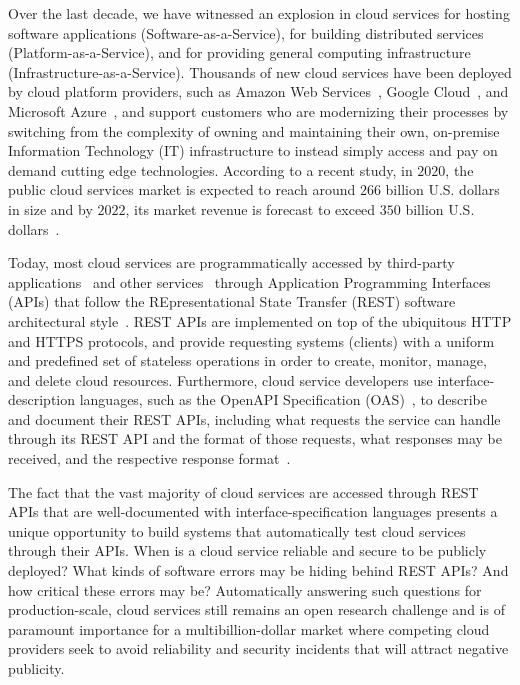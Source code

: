 \documentclass[letterpaper,single,8pt]{article}
\begin{document}
\title{\vspace{-1.2cm}{\bf Testing of Cloud Services}}
\author{ {\rm Vaggelis Atlidakis} }
\date{}
\maketitle

Over the last decade, we have witnessed an explosion in cloud services
for hosting software applications (Software-as-a-Service), for
building distributed services (Platform-as-a-Service),
and for providing general computing infrastructure
(Infrastructure-as-a-Service). Thousands of new cloud services have been
deployed by cloud platform providers, such as Amazon Web Services~\cite{aws},
Google Cloud~\cite{google-cloud}, and Microsoft Azure~\cite{azure}, and support
customers who are modernizing their processes by switching from the complexity
of owning and maintaining their own, on-premise Information Technology (IT)
infrastructure to instead
simply access and pay on demand cutting edge technologies. According to a recent
study, in $2020$, the public cloud services market is expected to reach around
$266$ billion U.S. dollars in size and by $2022$, its market revenue is forecast
to exceed $350$ billion U.S. dollars~\cite{cloudmarket}.

Today, most cloud services are programmatically accessed by third-party
applications~\cite{REST-book} and other services~\cite{services-book}
through Application Programming Interfaces (APIs) that follow the
REpresentational State Transfer (REST) software architectural style~\cite{REST}.
REST APIs are implemented
on top of the ubiquitous HTTP and HTTPS protocols, and provide requesting
systems (clients) with a uniform and predefined set of stateless operations
in order to create, monitor, manage, and delete cloud resources.
Furthermore, cloud service developers use interface-description languages,
such as the OpenAPI Specification (OAS)~\cite{openapi}, to describe and document
their REST APIs, including what requests the service can handle through its REST
API and the format of those requests, what responses may be received, and the
respective response format~\cite{azureapis,googleapis,awsapis}.

The fact that the vast majority of cloud services are accessed through REST APIs
that are well-documented with interface-specification languages
presents a unique opportunity to build systems that automatically
test cloud services through their APIs. When is a cloud service reliable
and secure to be publicly deployed? What kinds of software errors may be hiding
behind REST APIs? And how critical these errors may be?
Automatically answering such questions for production-scale, cloud services
still remains an open research challenge and is of paramount importance for a
multibillion-dollar market where competing cloud providers seek to avoid
reliability and security incidents that will attract negative publicity.
\end{document}
